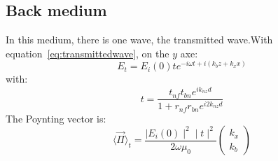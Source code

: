 \subsection{Back medium}
In this medium, there is one wave, the transmitted wave.With equation~\eqref{eq:transmittedwave}, on the $y$ axe:\\
\begin{equation*}
E_t = E_i(0)te^{-i\omega t+i(k_bz+k_xx)}
\end{equation*}
with:
$$
t = \frac{t_{nf}t_{bn}e^{ik_{nz}d}}{1+r_{nf}r_{bn}e^{i2k_{nz}d}}
$$
The Poynting vector is:\\
$$
\langle \vec{\Pi} \rangle _t = \frac{\mid E_i(0)\mid ^2\mid t\mid ^2}{2\omega \mu_0}
\begin{pmatrix}
k_x\\
k_b
\end{pmatrix}
$$